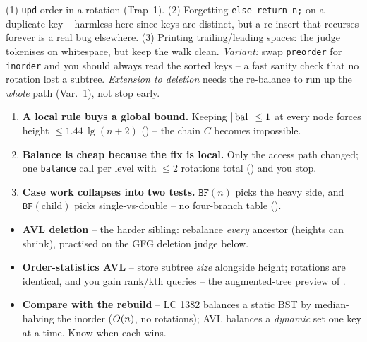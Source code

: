 \begin{warningbox}
(1) \texttt{upd} order in a rotation (Trap~1). (2) Forgetting \texttt{else return n;} on a duplicate key --
harmless here since keys are distinct, but a re-insert that recurses forever is a real bug elsewhere. (3)
Printing trailing/leading spaces: the judge tokenises on whitespace, but keep the walk clean. \emph{Variant:}
swap \texttt{preorder} for \texttt{inorder} and you should always read the sorted keys -- a fast
sanity check that no rotation lost a subtree. \emph{Extension to deletion} needs the re-balance to run up
the \emph{whole} path (Var.~1), not stop early.
\end{warningbox}

\begin{insightbox}
\begin{enumerate}[nosep, leftmargin=1.6em]
  \item \textbf{A local rule buys a global bound.} Keeping $|\operatorname{bal}|\le1$ at every node forces height
        $\le 1.44\,\lg(n+2)$ () -- the chain $C$ becomes impossible.
  \item \textbf{Balance is cheap because the fix is local.} Only the access path changed; one
        \texttt{balance} call per level with $\le2$ rotations total () and you stop.
  \item \textbf{Case work collapses into two tests.} $\texttt{BF}(n)$ picks the heavy side, and
        $\texttt{BF}(\text{child})$ picks single-vs-double -- no four-branch table ().
\end{enumerate}
\end{insightbox}

\begin{hardeningbox}
\begin{itemize}[nosep, leftmargin=1.4em]
  \item \textbf{AVL deletion} -- the harder sibling: rebalance \emph{every} ancestor (heights can shrink),
        practised on the GFG deletion judge below.
  \item \textbf{Order-statistics AVL} -- store subtree \emph{size} alongside height; rotations are
        identical, and you gain rank/kth queries -- the augmented-tree preview of .
  \item \textbf{Compare with the rebuild} -- LC 1382 balances a static BST by median-halving the inorder
        ($O(n)$, no rotations); AVL balances a \emph{dynamic} set one key at a time. Know when each wins.
\end{itemize}
\end{hardeningbox}


